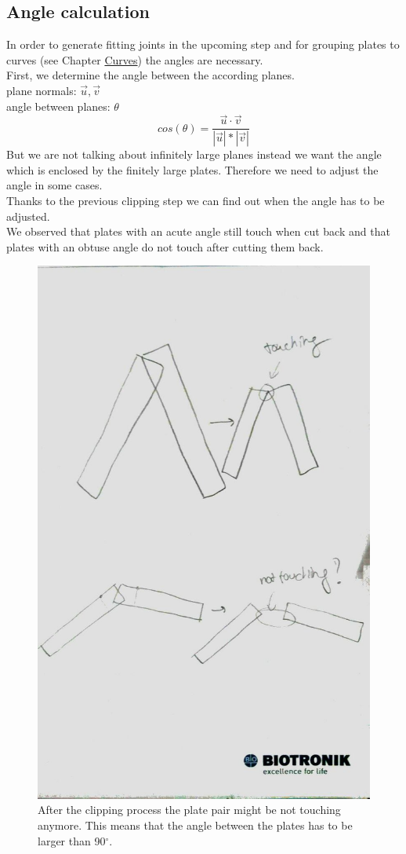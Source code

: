 \documentclass[../ClassicThesis.tex]{subfiles}
\begin{document}
\subsection{Angle calculation}\label{angleCalculation}
In order to generate fitting joints in the upcoming step and for grouping plates to curves (see Chapter \hyperref[ch:curves]{Curves}) the angles are necessary.\\
First, we determine the angle between the according planes.\\
plane normals: $\vec{u}, \vec{v}$\\
angle between planes: $\theta$
$$ cos(\theta) = \frac{\vec{u} \cdot \vec{v}}{|\vec{u}| * |\vec{v}|}$$
But we are not talking about infinitely large planes instead we want the angle which is enclosed by the finitely large plates. Therefore we need to adjust the angle in some cases.\\
Thanks to the previous clipping step we can find out when the angle has to be adjusted.\\
We observed that plates with an acute angle still touch when cut back and that plates with an obtuse angle do not touch after cutting them back.
\begin{figure}[!ht]
\centering
\includegraphics[width=.5\columnwidth]{Images/06-1-graph-TouchingOrNotAfterClipping.jpg}
\caption{After the clipping process the plate pair might be not touching anymore. This means that the angle between the plates has to be larger than 90$^\circ$.}
\end{figure}
\end{document}
